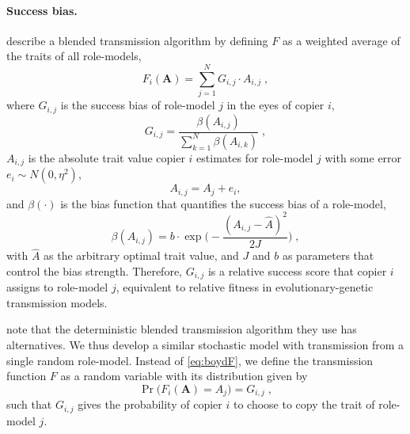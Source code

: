 \documentclass[12pt]{extarticle}
\let\vec\mathbf
\begin{document}
\paragraph{Success bias.}
\citet[Ch.~8, p.~247-249]{evolutionBook} describe a blended transmission algorithm by defining $F$ as a weighted average of the traits of all role-models, 
\begin{equation}\label{eq:boydF}
F_i(\vec{A}) = \sum_{j=1}^N G_{i,j}\cdot A_{i,j} \;, 
\end{equation}
where $G_{i,j}$ is the success bias of role-model $j$ in the eyes of copier $i$,
\begin{equation}\label{eq:boydG}
G_{i,j} = \frac{\beta(A_{i,j})}{\sum_{k=1}^{N} \beta(A_{i,k})} \;,
\end{equation}
$A_{i,j}$ is the absolute trait value copier $i$ estimates for role-model $j$ with some error $e_i \sim N(0,\eta^2)$,
\begin{equation}\label{eq:relativeTrait}
A_{i,j} = A_j + e_i,
\end{equation}
and $\beta(\cdot)$ is the bias function that quantifies the success bias of a role-model,
\begin{equation}\label{eq:success_bias}
\beta(A_{i,j}) = b \cdot \exp{\Big(-\frac{(A_{i,j} - \hat{A})^2}{2J}\Big)} \;,
\end{equation} 
with $\hat{A}$ as the arbitrary optimal trait value, and $J$ and $b$ as parameters that control the bias strength.
Therefore, $G_{i,j}$ is a relative success score that copier $i$ assigns to role-model $j$, equivalent to relative fitness in evolutionary-genetic transmission models.

\citet{evolutionBook} note that the deterministic blended transmission algorithm they use has alternatives. We thus develop a similar stochastic model with transmission from a single random role-model. Instead of \cref{eq:boydF}, we define the transmission function $F$ as a random variable with its distribution given by 
\begin{equation}\label{eq:ourF}
\Pr\big(F_i(\vec{A}) = A_{j}\big) = G_{i,j} \;,
\end{equation}
such that $G_{i,j}$ gives the probability of copier $i$ to choose to copy the trait of role-model $j$.
\end{document}
